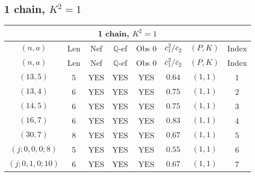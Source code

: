 \subsection{1 chain, $K^2 = 1$}
\begin{longtable}{|c|c|c|c|c|c|c|c|}
\hline
\multicolumn{8}{|c|}{1 chain, $K^2 = 1$}\\
\hline
$(n,a)$ & Len & Nef & $\mathbb Q$-ef & Obs 0 & $\overline c_1^2 / \overline c_2$ & $(P,K)$ & Index\\
\hline
\endfirsthead

\hline
$(n,a)$ & Len & Nef & $\mathbb Q$-ef & Obs 0 & $\overline c_1^2 / \overline c_2$ & $(P,K)$ & Index\\
\hline
\endhead
\hline
\endfoot

$(13,5)$ & 5 & YES & YES & YES & $0.64$ & $(1,1)$ & 1\\
$(13,4)$ & 6 & YES & YES & YES & $0.75$ & $(1,1)$ & 2\\
$(14,5)$ & 6 & YES & YES & YES & $0.75$ & $(1,1)$ & 3\\
$(16,7)$ & 6 & YES & YES & YES & $0.83$ & $(1,1)$ & 4\\
$(30,7)$ & 8 & YES & YES & YES & $0.67$ & $(1,1)$ & 5\\
$(j;0,0,0;8)$ & 5 & YES & YES & YES & $0.55$ & $(1,1)$ & 6\\
$(j;0,1,0;10)$ & 6 & YES & YES & YES & $0.67$ & $(1,1)$ & 7
\end{longtable}
